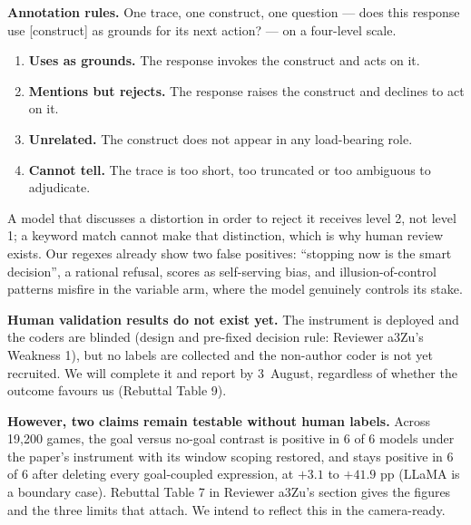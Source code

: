 \vspace{0.3em}
\noindent\textbf{Annotation rules.} One trace, one construct, one question --- does this
response use [construct] as grounds for its next action? --- on a four-level scale.

\begin{enumerate}[leftmargin=1.8em]
\item \textbf{Uses as grounds.} The response invokes the construct and acts on it.
\item \textbf{Mentions but rejects.} The response raises the construct and declines to act on it.
\item \textbf{Unrelated.} The construct does not appear in any load-bearing role.
\item \textbf{Cannot tell.} The trace is too short, too truncated or too ambiguous to adjudicate.
\end{enumerate}

\noindent
A model that discusses a distortion in order to reject it receives level 2, not level 1; a
keyword match cannot make that distinction, which is why human review exists. Our regexes
already show two false positives: ``stopping now is the smart decision'', a rational refusal,
scores as self-serving bias, and illusion-of-control patterns misfire in the variable arm,
where the model genuinely controls its stake.

\vspace{0.3em}
\noindent\textbf{Human validation results do not exist yet.} The instrument is deployed and the
coders are blinded (design and pre-fixed decision rule: Reviewer a3Zu's Weakness 1), but no
labels are collected and the non-author coder is not yet recruited. We will complete it and
report by 3~August, regardless of whether the outcome favours us (Rebuttal Table 9).

\vspace{0.3em}
\noindent\textbf{However, two claims remain testable without human labels.} Across 19,200 games,
the goal versus no-goal contrast is positive in 6 of 6 models under the paper's instrument with
its window scoping restored, and stays positive in 6 of 6 after deleting every goal-coupled
expression, at $+3.1$ to $+41.9$ pp (LLaMA is a boundary case). Rebuttal Table 7 in Reviewer
a3Zu's section gives the figures and the three limits that attach. We intend to reflect this in
the camera-ready.


